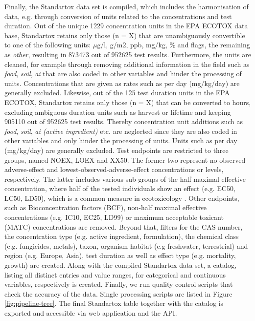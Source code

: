 Finally, the Standartox data set is compiled, which includes the harmonisation of data, e.g. through conversion of units related to the concentrations and test duration. Out of the unique 1229 concentration units in the EPA ECOTOX data base, Standartox retains only those (n = X) that are unambiguously convertible to one of the following units: $\mu$g/l, g/m2, ppb, mg/kg, \% and flags, the remaining as \textit{other}, resulting in 873473 out of 952625 test results. Furthermore, the units are cleaned, for example through removing additional information in the field such as \textit{food}, \textit{soil}, \textit{ai} that are also coded in other variables and hinder the processing of units. Concentrations that are given as rates such as per day (mg/kg/day) are generally excluded.
Likewise, out of the 125 test duration units in the EPA ECOTOX, Standartox retains only those (n = X) that can be converted to hours, excluding ambiguous duration units such as harvest or lifetime and keeping 905110 out of 952625 test results. Thereby concentration unit additions such as \textit{food}, \textit{soil}, \textit{ai (active ingredient)} etc. are neglected since they are also coded in other variables and only hinder the processing of units. Units such as per day (mg/kg/day) are generally excluded. Test endpoints are restricted to three groups, named NOEX, LOEX and XX50. The former two represent no-observed-adverse-effect and lowest-observed-adverse-effect concentrations or levels, respectively. The latter includes various sub-groups of the half maximal effective concentration, where half of the tested individuals show an effect (e.g. EC50, LC50, LD50), which is a common measure in ecotoxicology \citep{malaj_organic_2014}. Other endpoints, such as Bioconcentration factors (BCF), non-half maximal effective concentrations (e.g. IC10, EC25, LD99) or maximum acceptable toxicant (MATC) concentrations are removed. Beyond that, filters for the CAS number, the concentration type (e.g. active ingredient, formulation), the chemical class (e.g. fungicides, metals), taxon, organism habitat (e.g freshwater, terrestrial) and region (e.g. Europe, Asia), test duration as well as effect type (e.g. mortality, growth) are created. Along with the compiled Standartox data set, a catalog, listing all distinct entries and value ranges, for categorical and continuous variables, respectively is created. Finally, we run quality control scripts that check the accuracy of the data. Single processing scripts are listed in Figure \ref{fig:pipeline-tree}. The final Standartox table together with the catalog is exported and accessible via web application and the API.

